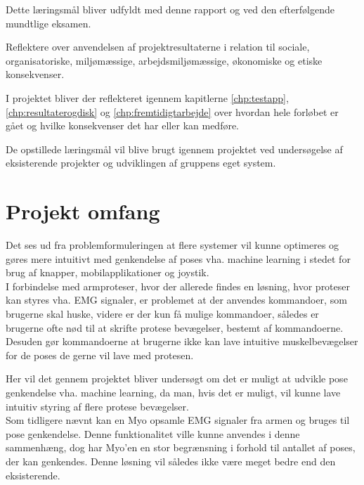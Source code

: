 \begin{myItemize}
	\begin{myItemize}
		\item Dette læringsmål bliver udfyldt med denne rapport og ved den efterfølgende mundtlige eksamen.
	\end{myItemize}
	\item Reflektere over anvendelsen af projektresultaterne i relation til sociale, organisatoriske, miljømæssige, arbejdsmiljømæssige, økonomiske og etiske konsekvenser.
	\begin{myItemize}
		\item I projektet bliver der reflekteret igennem kapitlerne \ref{chp:testapp}, \ref{chp:resultaterogdisk} og \ref{chp:fremtidigtarbejde} over hvordan hele forløbet er gået og hvilke konsekvenser det har eller kan medføre.
	\end{myItemize}
\end{myItemize}

De opstillede læringsmål vil blive brugt igennem projektet ved undersøgelse af eksisterende projekter og udviklingen af gruppens eget system.\\


\section{Projekt omfang}
Det ses ud fra problemformuleringen at flere systemer vil kunne optimeres og gøres mere intuitivt med genkendelse af poses vha. machine learning i stedet for brug af knapper, mobilapplikationer og joystik. \\

I forbindelse med armproteser, hvor der allerede findes en løsning, hvor proteser kan styres vha. EMG signaler, er problemet at der anvendes kommandoer, som brugerne skal huske, videre er der kun få mulige kommandoer, således er brugerne ofte nød til at skrifte protese bevægelser, bestemt af kommandoerne. Desuden gør kommandoerne at brugerne ikke kan lave intuitive muskelbevægelser for de poses de gerne vil lave med protesen. 

Her vil det gennem projektet bliver undersøgt om det er muligt at udvikle pose genkendelse vha. machine learning, da man, hvis det er muligt, vil kunne lave intuitiv styring af flere protese bevægelser. \\
Som tidligere nævnt kan en Myo opsamle EMG signaler fra armen og bruges til pose genkendelse. Denne funktionalitet ville kunne anvendes i denne sammenhæng, dog har Myo'en en stor begrænsning i forhold til antallet af poses, der kan genkendes. Denne løsning vil således ikke være meget bedre end den eksisterende.\\

